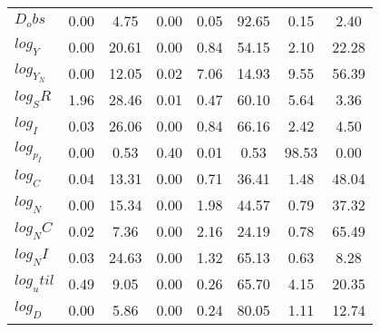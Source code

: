 \begin{center}
\begin{longtable}{lccccccc}
$D_obs     $	 & 	        0.00	 & 	        4.75	 & 	        0.00	 & 	        0.05	 & 	       92.65	 & 	        0.15	 & 	        2.40 \\ 
$log_Y     $	 & 	        0.00	 & 	       20.61	 & 	        0.00	 & 	        0.84	 & 	       54.15	 & 	        2.10	 & 	       22.28 \\ 
$log_Y_N   $	 & 	        0.00	 & 	       12.05	 & 	        0.02	 & 	        7.06	 & 	       14.93	 & 	        9.55	 & 	       56.39 \\ 
$log_SR    $	 & 	        1.96	 & 	       28.46	 & 	        0.01	 & 	        0.47	 & 	       60.10	 & 	        5.64	 & 	        3.36 \\ 
$log_I     $	 & 	        0.03	 & 	       26.06	 & 	        0.00	 & 	        0.84	 & 	       66.16	 & 	        2.42	 & 	        4.50 \\ 
$log_p_I   $	 & 	        0.00	 & 	        0.53	 & 	        0.40	 & 	        0.01	 & 	        0.53	 & 	       98.53	 & 	        0.00 \\ 
$log_C     $	 & 	        0.04	 & 	       13.31	 & 	        0.00	 & 	        0.71	 & 	       36.41	 & 	        1.48	 & 	       48.04 \\ 
$log_N     $	 & 	        0.00	 & 	       15.34	 & 	        0.00	 & 	        1.98	 & 	       44.57	 & 	        0.79	 & 	       37.32 \\ 
$log_NC    $	 & 	        0.02	 & 	        7.36	 & 	        0.00	 & 	        2.16	 & 	       24.19	 & 	        0.78	 & 	       65.49 \\ 
$log_NI    $	 & 	        0.03	 & 	       24.63	 & 	        0.00	 & 	        1.32	 & 	       65.13	 & 	        0.63	 & 	        8.28 \\ 
$log_util  $	 & 	        0.49	 & 	        9.05	 & 	        0.00	 & 	        0.26	 & 	       65.70	 & 	        4.15	 & 	       20.35 \\ 
$log_D     $	 & 	        0.00	 & 	        5.86	 & 	        0.00	 & 	        0.24	 & 	       80.05	 & 	        1.11	 & 	       12.74 \\ 
\end{longtable}
 \end{center}
